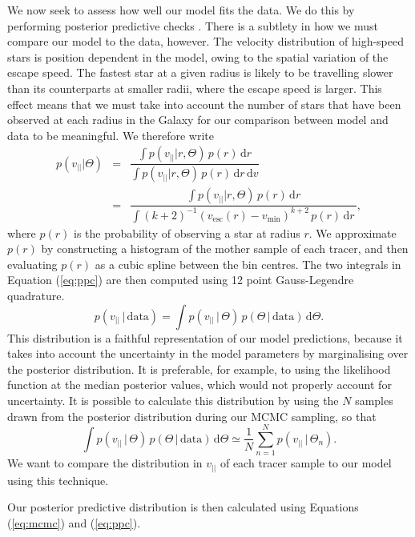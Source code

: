 \documentclass[useAMS,twocolumn,usenatbib]{mn2e}
\def\vlos{{v_{||}}}
\def\vesc{{v_\mathrm{esc}}}
\def\vmin{{v_\mathrm{min}}}
\def\intd{{\mathrm{d}}}
\begin{document}
We now seek to assess how well our model fits the data. We do this by 
performing posterior predictive checks \citet{Ge13}. There is a subtlety in how we must compare our model 
to the data, however. The velocity distribution  of high-speed stars is position dependent in the model, 
owing to the spatial variation of the escape speed. The fastest star at a given radius is likely to be 
travelling slower than its counterparts at smaller radii, where the escape speed is larger. This effect 
means that we must take into account the number of stars that have been observed at each radius in the 
Galaxy for our comparison between model and data to be meaningful. We therefore write  
%
\begin{eqnarray}
p(\vlos | \Theta) &=& \dfrac{\int p(\vlos | r, \Theta)\,p(r)\,\intd r}{\int p(\vlos | r, \Theta)\,p(r)\,\intd r\,\intd v} \nonumber \\
                  &=& \dfrac{\int p(\vlos | r, \Theta)\,p(r)\,\intd r}{\int (k+2)^{-1}(\vesc(r) - \vmin)^{k+2}\,p(r)\,\intd r\,},
\label{eq:ppc}
\end{eqnarray}
%
where $p(r)$ is the probability of observing a star at radius $r$. We approximate 
$p(r)$ by constructing a histogram of the mother sample of each tracer, and then 
evaluating $p(r)$ as a cubic spline between the bin centres. The two integrals in 
Equation (\ref{eq:ppc}) are then computed using 12 point Gauss-Legendre quadrature. 
%
\begin{equation}
p(\vlos\,|\,\mathrm{data}) = \int p(\vlos\,|\,\Theta)\,p(\Theta\,|\,\mathrm{data})\,\intd \Theta.
\end{equation}
%
This distribution is a faithful representation of our model predictions, because it takes into 
account the uncertainty in the model parameters by marginalising over the posterior 
distribution. It is preferable, for example, to using the likelihood function at the 
median posterior values, which would not properly account for uncertainty. It is 
possible to calculate this distribution by using the $N$ samples drawn from 
the posterior distribution during our MCMC sampling, so that
%
\begin{equation}
\int p(\vlos\,|\,\Theta)\,p(\Theta\,|\,\mathrm{data})\,\intd \Theta \simeq \dfrac{1}{N}\sum\limits_{n=1}^Np(\vlos\,|\,\Theta_n).
\label{eq:mcmc}
\end{equation}
%
We want to compare the distribution in $\vlos$ of each tracer sample to our model using this technique. 


Our posterior predictive distribution is then calculated using Equations (\ref{eq:mcmc}) 
and (\ref{eq:ppc}).
\end{document}
